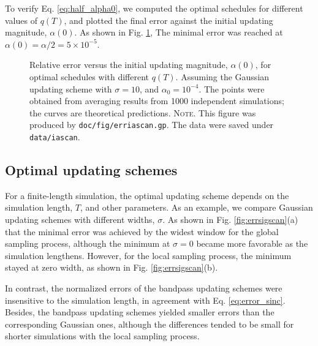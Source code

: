 \documentclass[reprint, floatfix]{revtex4-1}
\newcommand{\note}[1]{{\color{DarkGreen}\footnotesize \textsc{Note.} #1}}
\begin{document}
To verify Eq. \eqref{eq:half_alpha0},
we computed the optimal schedules
for different values of $q(T)$,
and plotted the final error
against the initial updating magnitude, $\alpha(0)$.
%
As shown in Fig. \ref{fig:erriascan},
The minimal error was reached at
$\alpha(0) = \alpha/2 = 5 \times 10^{-5}$.


\begin{figure}[h]
\begin{center}
  \caption{
    \label{fig:erriascan}
    Relative error
    versus the initial updating magnitude, $\alpha(0)$,
    for optimal schedules with different $q(T)$.
    Assuming the Gaussian updating scheme
    with $\sigma = 10$,
    and $\alpha_0 = 10^{-4}$.
    The points were obtained from averaging results
    from 1000 independent simulations;
    the curves are theoretical predictions.
    \note{This figure was produced by
      \texttt{doc/fig/erriascan.gp}.
      The data were saved under
      \texttt{data/iascan}.
    }%
  }
\end{center}
\end{figure}






\subsection{\label{sec:results_cmpschemes}
Optimal updating schemes}



For a finite-length simulation,
the optimal updating scheme
depends on the simulation length, $T$,
and other parameters.
%
As an example,
we compare Gaussian updating schemes
with different widths, $\sigma$.
%
As shown in Fig. \ref{fig:errsigscan}(a)
that the minimal error was achieved
by the widest window %
for the global sampling process,
%
although
the minimum at $\sigma = 0$ became more favorable
as the simulation lengthens.
%
However,
for the local sampling process,
the minimum stayed at zero width,
as shown in Fig. \ref{fig:errsigscan}(b).


In contrast,
the normalized errors of the bandpass updating schemes
were insensitive to the simulation length,
in agreement with Eq. \eqref{eq:error_sinc}.
%
Besides, the bandpass updating schemes
yielded smaller errors than
the corresponding Gaussian ones,
although the differences tended to
be small for shorter simulations
with the local sampling process.
\end{document}
